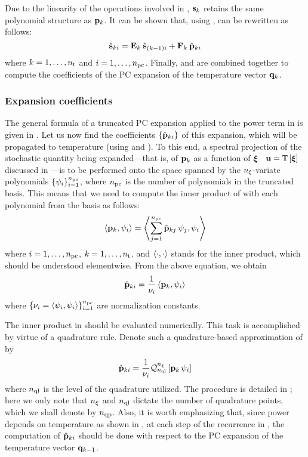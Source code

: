 Due to the linearity of the operations involved in , $\mathbf{s}_k$
retains the same polynomial structure as $\mathbf{p}_k$. It can be shown that, using
,  can be rewritten as follows:
\begin{equation} \elabel{pc-recurrence}
  \pcc{\vS}_{ki} = \mCF_k \: \pcc{\vS}_{(k - 1)i} + \mCS_k \: \pcc{\vP}_{ki}
\end{equation}
where $k = 1, \dotsc, {n_\text{t}}$ and $i = 1, \dotsc, {n_\text{pc}}$. Finally,
 and  are combined together to compute
the coefficients of the PC expansion of the temperature vector $\mathbf{q}_k$.

\subsubsection{Expansion coefficients} 
The general formula of a truncated PC expansion applied to the power term in
 is given in . Let us now find the
coefficients $\{ \hat{\mathbf{p}}_{ki} \}$ of this expansion, which will be propagated
to temperature (using  and ). To this
end, a spectral projection of the stochastic quantity being expanded---that is,
of $\mathbf{p}_k$ as a function of $\boldsymbol{\xi}$ \via\ $\vU = \oTransform{\vZ}$ discussed in
---is to be performed onto the space spanned by the
${n_\xi}$-variate polynomials $\{ \psi_i \}_{i = 1}^{{n_\text{pc}}}$, where ${n_\text{pc}}$
is the number of polynomials in the truncated basis. This means that we need to
compute the inner product of  with each polynomial from the
basis as follows:
\[
  \oInner{\vP_k}{\pcb_i} = \oInner{\sum_{j=1}^{\pcterms} \pcc{\vP}_{kj} \: \pcb_j}{\pcb_i}
\]
where $i = 1, \dotsc, {n_\text{pc}}$, $k = 1, \dotsc, {n_\text{t}}$, and
$\oInner{\cdot}{\cdot}$ stands for the inner product, which should be understood
elementwise. From the above equation, we obtain
\begin{equation} \elabel{pc-coefficients}
  \pcc{\vP}_{ki} = \frac{1}{\pcn_i} \oInner{\vP_k}{\pcb_i}
\end{equation}
where $\{ \pcn_i = \oInner{\pcb_i}{\pcb_i} \}_{i = 1}^\pcterms$ are
normalization constants.

The inner product in  should be evaluated numerically.
This task is accomplished by virtue of a quadrature rule. Denote such a
quadrature-based approximation of  by
\begin{equation} \elabel{pc-coefficients-quadrature}
  \pcc{\vP}_{ki} = \frac{1}{\pcn_i} \oQuad{\nvars}{\qdlevel}{\vP_k \, \pcb_i}
\end{equation}
where ${n_\text{ql}}$ is the level of the quadrature utilized. The procedure is
detailed in \cite{ukhov2014}; here we only note that ${n_\xi}$ and ${n_\text{ql}}$
dictate the number of quadrature points, which we shall denote by ${n_\text{qp}}$.
Also, it is worth emphasizing that, since power depends on temperature as shown
in , at each step of the recurrence in ,
the computation of $\hat{\mathbf{p}}_{ki}$ should be done with respect to the PC
expansion of the temperature vector $\mathbf{q}_{k - 1}$.

